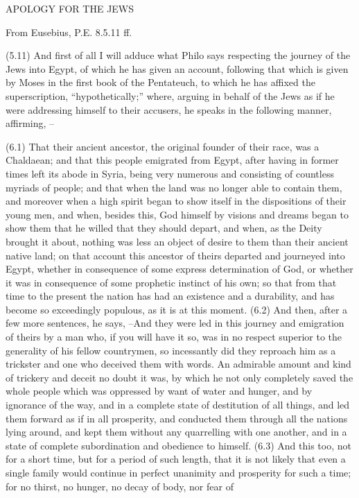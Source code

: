 APOLOGY FOR THE JEWS

From Eusebius, P.E. 8.5.11 ff.

(5.11) And first of all I will adduce what Philo says respecting the journey of the Jews into Egypt, of
which he has given an account, following that which is given by Moses in the first book of the
Pentateuch, to which he has affixed the superscription, ``hypothetically;'' where, arguing in behalf of the
Jews as if he were addressing himself to their accusers, he speaks in the following manner, affirming, --

(6.1) That their ancient ancestor, the original founder of their race, was a Chaldaean; and that this
people emigrated from Egypt, after having in former times left its abode in Syria, being very numerous
and consisting of countless myriads of people; and that when the land was no longer able to contain
them, and moreover when a high spirit began to show itself in the dispositions of their young men, and
when, besides this, God himself by visions and dreams began to show them that he willed that they
should depart, and when, as the Deity brought it about, nothing was less an object of desire to them
than their ancient native land; on that account this ancestor of theirs departed and journeyed into
Egypt, whether in consequence of some express determination of God, or whether it was in consequence
of some prophetic instinct of his own; so that from that time to the present the nation has had an
existence and a durability, and has become so exceedingly populous, as it is at this moment. (6.2) And
then, after a few more sentences, he says, --And they were led in this journey and emigration of theirs by
a man who, if you will have it so, was in no respect superior to the generality of his fellow countrymen,
so incessantly did they reproach him as a trickster and one who deceived them with words. An admirable
amount and kind of trickery and deceit no doubt it was, by which he not only completely saved the whole
people which was oppressed by want of water and hunger, and by ignorance of the way, and in a
complete state of destitution of all things, and led them forward as if in all prosperity, and conducted
them through all the nations lying around, and kept them without any quarrelling with one another,
and in a state of complete subordination and obedience to himself. (6.3) And this too, not for a short
time, but for a period of such length, that it is not likely that even a single family would continue in
perfect unanimity and prosperity for such a time; for no thirst, no hunger, no decay of body, nor fear of
